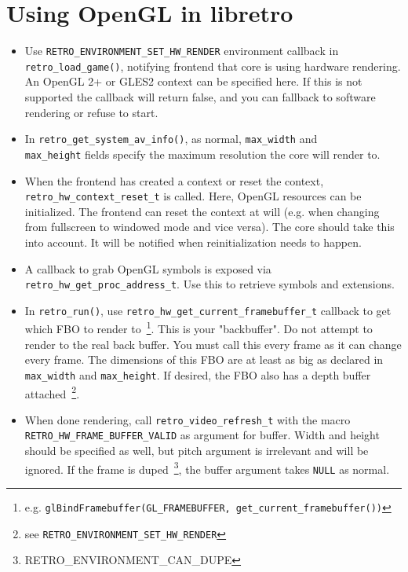 \documentclass[11pt]{article}
\begin{document}
\section*{Using OpenGL in libretro}

\begin{itemize}
\item Use \texttt{RETRO\_ENVIRONMENT\_SET\_HW\_RENDER} environment callback in \\\texttt{retro\_load\_game()}, notifying frontend that core is using hardware rendering. An OpenGL 2+ or GLES2 context can be specified here. If this is not supported the callback will return false, and you can fallback to software rendering or refuse to start.

\item In \texttt{retro\_get\_system\_av\_info()}, as normal, \texttt{max\_width} and \\\texttt{max\_height} fields specify the maximum resolution the core will render to.

\item When the frontend has created a context or reset the context, \\\texttt{retro\_hw\_context\_reset\_t} is called. Here, OpenGL resources can be initialized.
The frontend can reset the context at will (e.g. when changing from fullscreen to windowed mode and vice versa). The core should take this into account. It will be notified when reinitialization needs to happen.

\item A callback to grab OpenGL symbols is exposed via \\\texttt{retro\_hw\_get\_proc\_address\_t}. Use this to retrieve symbols and extensions.

\item In \texttt{retro\_run()}, use \texttt{retro\_hw\_get\_current\_framebuffer\_t} callback
to get which FBO to render to~\footnote{e.g. \texttt{glBindFramebuffer(GL\_FRAMEBUFFER, get\_current\_framebuffer())}}. This is your "backbuffer". Do not attempt to render to the real back buffer. You must call this every frame as it can change every frame. The dimensions of this FBO are at least as big as declared in \texttt{max\_width} and \texttt{max\_height}. If desired, the FBO also has a depth buffer attached~\footnote{see \texttt{RETRO\_ENVIRONMENT\_SET\_HW\_RENDER}}.

\item When done rendering, call \texttt{retro\_video\_refresh\_t} with the macro \texttt{RETRO\_HW\_FRAME\_BUFFER\_VALID} as argument for buffer. Width and height should be specified as well, but pitch argument is irrelevant and will be ignored. If the frame is duped~\footnote{RETRO\_ENVIRONMENT\_CAN\_DUPE}, the buffer argument takes \texttt{NULL} as normal.
\end{itemize}
\end{document}

